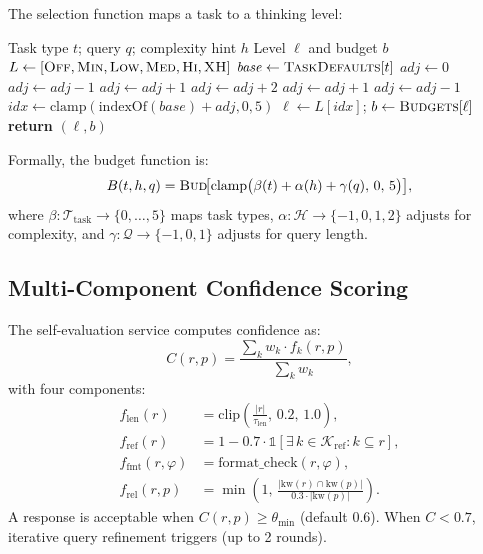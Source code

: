 \documentclass{article}
\theoremstyle{plain}
\theoremstyle{definition}
\newcommand{\algorithmicreturn}{\textbf{return}}
\newcommand{\RETURN}{\STATE \algorithmicreturn{} }
\newcommand{\indicator}{\mathbb{1}}
\begin{document}
The selection function maps a task to a thinking level:

\begin{algorithm}[ht!]
\caption{Adaptive Thinking Level Selection}
\label{alg:thinking}
\begin{algorithmic}
\REQUIRE Task type $t$; query $q$; complexity hint $h$
\ENSURE Level $\ell$ and budget $b$
\STATE $L \leftarrow [\textsc{Off}, \textsc{Min}, \textsc{Low}, \textsc{Med}, \textsc{Hi}, \textsc{XH}]$
\STATE $\mathit{base} \leftarrow \textsc{TaskDefaults}[t]$
\STATE $\mathit{adj} \leftarrow 0$
 \STATE $\mathit{adj} \leftarrow \mathit{adj} - 1$ \ENDIF
{} \STATE $\mathit{adj} \leftarrow \mathit{adj} + 1$ \ENDIF
{} \STATE $\mathit{adj} \leftarrow \mathit{adj} + 2$ \ENDIF
{} \STATE $\mathit{adj} \leftarrow \mathit{adj} + 1$ \ENDIF
{} \STATE $\mathit{adj} \leftarrow \mathit{adj} - 1$ \ENDIF
\STATE $\mathit{idx} \leftarrow \mathrm{clamp}(\mathrm{indexOf}(\mathit{base}) + \mathit{adj}, 0, 5)$
\STATE $\ell \leftarrow L[\mathit{idx}]$; \; $b \leftarrow \textsc{Budgets}[\ell]$
\RETURN $(\ell, b)$
\end{algorithmic}
\end{algorithm}

Formally, the budget function is:
\begin{equation}\label{eq:budget}
  B(t, h, q) = \textsc{Bud}\!\bigl[\mathrm{clamp}\bigl(\beta(t) + \alpha(h) + \gamma(q),\, 0,\, 5\bigr)\bigr],
\end{equation}
where $\beta\!: \mathcal{T}_\mathrm{task} \to \{0,\ldots,5\}$ maps task types,
$\alpha\!: \mathcal{H} \to \{-1, 0, 1, 2\}$ adjusts for complexity, and
$\gamma\!: \mathcal{Q} \to \{-1, 0, 1\}$ adjusts for query length.

\subsection{Multi-Component Confidence Scoring}\label{sec:confidence}

The self-evaluation service computes confidence as:
\begin{equation}\label{eq:confidence}
  C(r, p) = \frac{\sum_{k} w_k \cdot f_k(r, p)}{\sum_{k} w_k},
\end{equation}
with four components:
\begin{align}
  f_\mathrm{len}(r) &= \mathrm{clip}\!\left(\tfrac{|r|}{\tau_\mathrm{len}},\, 0.2,\, 1.0\right), \label{eq:f_len} \\
  f_\mathrm{ref}(r) &= 1 - 0.7 \cdot \indicator[\exists\, k {\in} \mathcal{K}_\mathrm{ref}\!: k {\subseteq} r], \label{eq:f_ref} \\
  f_\mathrm{fmt}(r, \varphi) &= \mathrm{format\_check}(r, \varphi), \label{eq:f_fmt} \\
  f_\mathrm{rel}(r, p) &= \min\!\left(1,\, \tfrac{|\mathrm{kw}(r) \cap \mathrm{kw}(p)|}{0.3 \cdot |\mathrm{kw}(p)|}\right). \label{eq:f_rel}
\end{align}
A response is acceptable when $C(r, p) \geq \theta_\mathrm{min}$ (default
$0.6$).  When $C < 0.7$, iterative query refinement triggers (up to 2 rounds).
\end{document}
